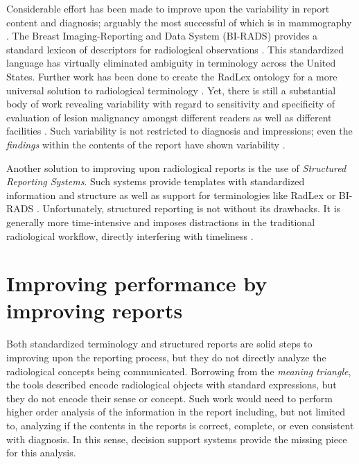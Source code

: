 Considerable effort has been made to improve upon the variability in report content and diagnosis; arguably the most successful of which is in mammography \cite{Langlotz:2009fn,Burnside:2009ki}. The Breast Imaging-Reporting and Data System (BI-RADS) provides a standard lexicon of descriptors for radiological observations \cite{Liberman:ws}. This standardized language has virtually eliminated ambiguity in terminology across the United States. Further work has been done to create the RadLex ontology for a more universal solution to radiological terminology \cite{Langlotz:2006jn}. Yet, there is still a substantial body of work revealing variability with regard to sensitivity and specificity of evaluation of lesion malignancy amongst different readers as well as different facilities \cite{Jackson:2009fw, Beam:1996ui, Elmore:2002vc, Taplin:2008bv}. Such variability is not restricted to diagnosis and impressions; even the \emph{findings} within the contents of the report have shown variability \cite{Hobby:2000th, Robinson:1997uq}.

Another solution to improving upon radiological reports is the use of \emph{Structured Reporting Systems}. Such systems provide templates with standardized information and structure as well as support for terminologies like RadLex or BI-RADS \cite{Reiner:2009ib}. Unfortunately, structured reporting is not without its drawbacks. It is generally more time-intensive and imposes distractions in the traditional radiological workflow, directly interfering with timeliness \cite{Weiss:2008er}.

\section{Improving performance by improving reports}
Both standardized terminology and structured reports are solid steps to improving upon the reporting process, but they do not directly analyze the radiological concepts being communicated. Borrowing from the \emph{meaning triangle}, the tools described encode radiological objects with standard expressions, but they do not encode their sense or concept. Such work would need to perform higher order analysis of the information in the report including, but not limited to, analyzing if the contents in the reports is correct, complete, or even consistent with diagnosis. In this sense, decision support systems provide the missing piece for this analysis.

